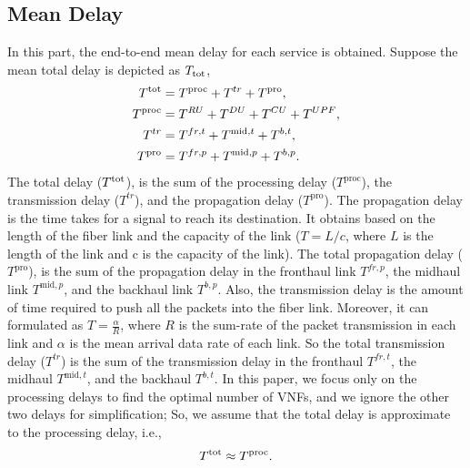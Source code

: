\documentclass{article}
\begin{document}
\subsection{Mean Delay}
In this part, the end-to-end mean delay for each service is obtained.
Suppose the mean total delay is depicted as $T_{\text{\text{tot}}}$,
\begin{equation}
\begin{split}
T^{\text{\text{tot}}} &=  T^{\text{proc}} + T^{tr} + T^{\text{pro}},\\
T^{\text{\text{proc}}} &=  T^{RU} + T^{DU} + T^{CU} + T^{UPF},\\
T^{tr} &= T^{fr,t} + T^{\text{mid},t} + T^{b,t},  \\
T^{\text{pro}} &= T^{fr,p} + T^{\text{mid},p} + T^{b,p}.  \\
\end{split}
\end{equation}
The total delay ($T^{\text{\text{tot}}}$), is the sum of the processing delay ($T^{\text{proc}}$), the transmission delay ($T^{tr}$), and the propagation delay ($T^{\text{pro}}$). 
The propagation delay is the time takes for a signal to reach its destination. It obtains based on the length of the fiber link and the capacity of the link ($T = L/c$, where $L$ is the length of the link and c is the capacity of the link). The total propagation delay ($T^{\text{pro}}$), is the sum of the propagation delay in the fronthaul link $T^{fr,p}$, the midhaul link $T^{\text{mid},p}$, and the backhaul link $T^{b,p}$.
Also, the transmission delay is the amount of time required to push all the packets into the fiber link.
Moreover, it can formulated as 
$T = \frac{\mathcal{\alpha}}{R}$, where $R$ is the sum-rate of the packet transmission in each link and $\mathcal{\alpha}$ is the mean arrival data rate of each link.
So the total transmission delay ($T^{tr}$) is the sum of the transmission delay in the fronthaul $T^{fr,t}$, the midhaul $T^{\text{mid},t}$, and the backhaul $T^{b,t}$.
In this paper, we focus only on the processing delays to find the optimal number of VNFs, and we ignore the other two delays for simplification;
So, we assume that the total delay is approximate to the processing delay, i.e.,
\begin{equation}
T^{\text{\text{tot}}} \approx T^{\text{proc}}.
\end{equation}
\end{document}
